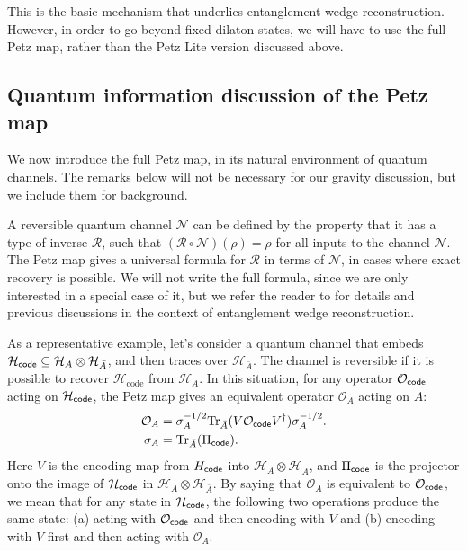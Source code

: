 \documentclass[12pt]{article}
\numberwithin{equation}{section}
\def\tr{\text{Tr}}
\begin{document}
This is the basic mechanism that underlies entanglement-wedge reconstruction. However, in order to go beyond fixed-dilaton states, we will have to use the full Petz map, rather than the Petz Lite version discussed above. 


\subsection{Quantum information discussion of the Petz map}\label{sec:qipetz}
{We now introduce the full Petz map, in its natural environment of quantum channels. The remarks below will not be necessary for our gravity discussion, but we include them for background.}

A reversible quantum channel $\mathcal{N}$ can be defined by the property that it has a type of inverse $\mathcal{R}$, such that $(\mathcal{R}\circ \mathcal{N})(\rho) = \rho$ for all inputs to the channel $\mathcal{N}$. The Petz map \cite{petz1986sufficient,petz1988sufficiency,hayden2004structure} gives a universal formula for $\mathcal{R}$ in terms of $\mathcal{N}$, in cases where exact recovery is possible. We will not write the full formula, since we are only interested in a special case of it, but we refer the reader to  \cite{cotler2019entanglement,chen2019entanglement} for details and previous discussions in the context of entanglement wedge reconstruction.

As a representative example, let's consider a quantum channel that embeds $\mathcal{H}_{\sf code} \subseteq \mathcal{H}_{A} \otimes \mathcal{H}_{\bar A}$, and then traces over $\mathcal{H}_{\bar A}$. The channel is reversible if it is possible to recover $\mathcal{H}_{\text{code}}$ from $\mathcal{H}_A$. In this situation, for any operator $\mathcal{O}_{\sf code}$ acting on $\mathcal{H}_{\sf code}$, the Petz map gives an equivalent operator $\mathcal{O}_A$ acting on $A$:
\begin{align}
\mathcal{O}_A &= \sigma_A^{-1/2} \tr_{\bar A}(V \mathcal{O}_{\sf code}V^\dag)\sigma_A^{-1/2}.\label{petzQI}\\
\sigma_A &= \tr_{\bar A}(\Pi_{\sf code}).
\end{align}
Here $V$ is the encoding map from $H_{\sf code}$ into $\mathcal{H}_A\otimes \mathcal{H}_{\bar A}$, and $\Pi_{\sf code}$ is the projector onto the image of $\mathcal{H}_{\sf code}$ in $\mathcal{H}_{A}\otimes \mathcal{H}_{\bar A}$. By saying that $\mathcal{O}_A$ is equivalent to $\mathcal{O}_{\sf code}$, we mean that for any state in $\mathcal{H}_{\sf code}$, the following two operations produce the same state: (a) acting with $\mathcal{O}_{\sf code}$ and then encoding with $V$ and (b) encoding with $V$ first and then acting with $\mathcal{O}_A$.
\end{document}
